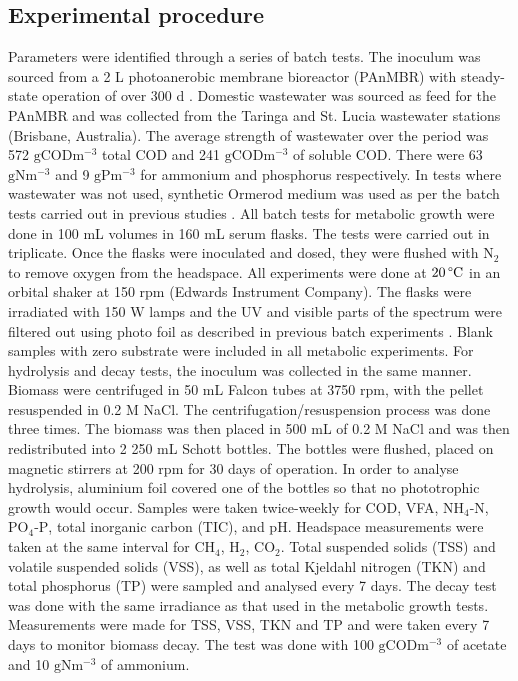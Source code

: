 \subsection{Experimental procedure}
Parameters were identified through a series of batch tests. The inoculum was sourced from a 2 L photoanerobic membrane bioreactor (PAnMBR) with steady-state operation of over 300 d \cite{Hulsen2016}. Domestic wastewater was sourced as feed for the PAnMBR and was collected from the Taringa and St. Lucia wastewater stations (Brisbane, Australia). The average strength of wastewater over the period was 572 $\mathrm{g COD m^{-3}}$ total COD and 241 $\mathrm{g COD m^{-3}}$ of soluble COD. There were 63 $\mathrm{g N m^{-3}}$ and 9 $\mathrm{g P m^{-3}}$ for ammonium and phosphorus respectively. In tests where wastewater was not used, synthetic Ormerod medium was used as per the batch tests carried out in previous studies \cite{Hulsen2014}. 
\skippingparagraph
All batch tests for metabolic growth were done in 100 mL volumes in 160 mL serum flasks. The tests were carried out in triplicate. Once the flasks were inoculated and dosed, they were flushed with $\mathrm{N_2}$ to remove oxygen from the headspace. All experiments were done at $\mathrm{20 \, \degree C}$ in an orbital shaker at 150 rpm (Edwards Instrument Company). The flasks were irradiated with 150 W lamps and the UV and visible parts of the spectrum were filtered out using photo foil as described in previous batch experiments \cite{Hulsen2014}. Blank samples with zero substrate were included in all metabolic experiments.
\skippingparagraph
For hydrolysis and decay tests, the inoculum was collected in the same manner. Biomass were centrifuged in 50 mL Falcon tubes at 3750 rpm, with the pellet resuspended in 0.2 M NaCl. The centrifugation/resuspension process was done three times. The biomass was then placed in 500 mL of 0.2 M NaCl and was then redistributed into 2 250 mL Schott bottles. The bottles were flushed, placed on magnetic stirrers at 200 rpm for 30 days of operation. In order to analyse hydrolysis, aluminium foil covered one of the bottles so that no phototrophic growth would occur. Samples were taken twice-weekly for COD, VFA, $\mathrm{NH_4\mbox{-}N}$, $\mathrm{PO_4\mbox{-}P}$, total inorganic carbon (TIC), and pH. Headspace measurements were taken at the same interval for $\mathrm{CH_4}$, $\mathrm{H_2}$, $\mathrm{CO_2}$. Total suspended solids (TSS) and volatile suspended solids (VSS), as well as total Kjeldahl nitrogen (TKN) and total phosphorus (TP) were sampled and analysed every 7 days. The decay test was done with the same irradiance as that used in the metabolic growth tests. Measurements were made for TSS, VSS, TKN and TP and were taken every 7 days to monitor biomass decay. The test was done with 100 $\mathrm{g COD m^{-3}}$ of acetate and 10 $\mathrm{g N m^{-3}}$ of ammonium. 
